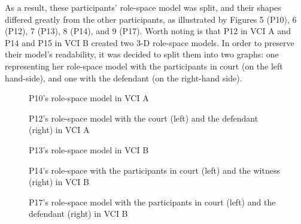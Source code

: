 \documentclass[output=paper]{langsci/langscibook}
\begin{document}
As a result, these participants’ role-space model was split, and their shapes differed greatly from the other participants, as illustrated by Figures 5 (P10), 6 (P12), 7 (P13), 8 (P14), and 9 (P17). Worth noting is that P12 in VCI A and P14 and P15 in VCI B created two 3-D role-space models. In order to preserve their model’s readability, it was decided to split them into two graphs: one representing her role-space model with the participants in court (on the left hand-side), and one with the defendant (on the right-hand side).

  

 

\begin{figure}
\caption{P10's role-space model in VCI A}
\end{figure}


  
   
 


\begin{figure}
\caption{P12’s role-space model with the court (left) and the defendant (right) in VCI A}
\end{figure}

  
 

\begin{figure}
\caption{P13's role-space model in VCI B}
\end{figure}

  
   
 

\begin{figure}
\caption{P14's role-space with the participants in court (left) and the witness (right) in VCI B}
\end{figure}

\begin{figure}
  
   
\caption{\label{fig:devaux:15}P17's role-space model with the participants in court (left) and the defendant (right) in VCI B}
\end{figure}
\end{document}
